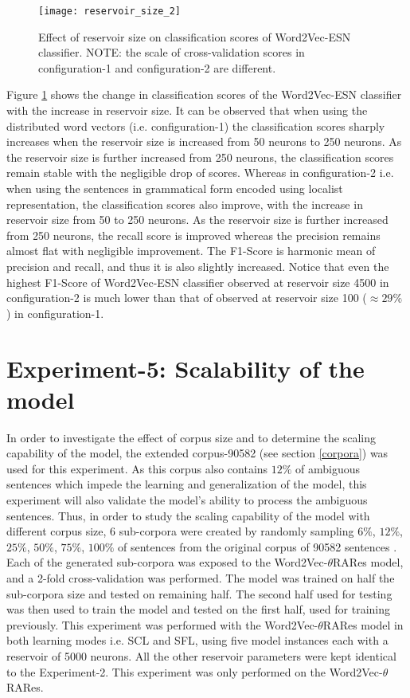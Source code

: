 \begin{figure}[hbtp]
\centering
\texttt{[image: reservoir\_size\_2]}
\caption[Effect of reservoir size on Word2Vec-ESN classifier.]{Effect of reservoir size on classification scores of Word2Vec-ESN classifier. NOTE: the scale of cross-validation scores in configuration-1 and configuration-2 are different.}
\label{fig:reservoir_size_2}
\end{figure}

Figure \ref{fig:reservoir_size_2} shows the change in classification scores of the Word2Vec-ESN classifier with the increase in reservoir size. It can be observed that when using the distributed word vectors (i.e. configuration-1) the classification scores sharply increases when the reservoir size is increased from 50 neurons to 250 neurons. As the reservoir size is further increased from 250 neurons, the classification scores remain stable with the negligible drop of scores. Whereas in configuration-2 i.e. when using the sentences in grammatical form encoded using localist representation, the classification scores also improve, with the increase in reservoir size from 50 to 250 neurons. As the reservoir size is further increased from 250 neurons, the recall score is improved whereas the precision remains almost flat with negligible improvement. The F1-Score is harmonic mean of precision and recall, and thus it is also slightly increased. Notice that even the highest F1-Score of Word2Vec-ESN classifier observed at reservoir size 4500 in configuration-2 is much lower than that of observed at reservoir size 100 ($\approx 29 \%$ ) in configuration-1.

\section{Experiment-5: Scalability of the model}

In order to investigate the effect of corpus size and to determine the scaling capability of the model, the extended corpus-90582 (see section \ref{corpora}) was used for this experiment. As this corpus also contains $12\%$ of ambiguous sentences \cite{xavier:2013:RT} which impede the learning and generalization of the model, this experiment will also validate the model's ability to process the ambiguous sentences. Thus, in order to study the scaling capability of the model with different corpus size, 6 sub-corpora were created by randomly sampling $6\%$, $12\%$, $25\%$, $50\%$, $75\%$, $100\%$ of sentences from the original corpus of 90582 sentences \cite{xavier:2013:RT}. Each of the generated sub-corpora was exposed to the Word2Vec-$\theta$RARes model, and a 2-fold cross-validation was performed. The model was trained on half the sub-corpora size and tested on remaining half. The second half used for testing was then used to train the model and tested on the first half, used for training previously. This experiment was performed with the Word2Vec-$\theta$RARes model in both learning modes i.e. SCL and SFL, using five model instances each with a reservoir of 5000 neurons. All the other reservoir parameters were kept identical to the Experiment-2. This experiment was only performed on the Word2Vec-$\theta$RARes.

